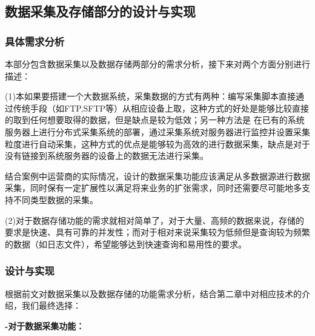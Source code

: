 \documentclass{HustGraduPaper}
\begin{document}
    \subsection{数据采集及存储部分的设计与实现}
    \subsubsection{具体需求分析}
    本部分包含数据采集以及数据存储两部分的需求分析，接下来对两个方面分别进行描述：
    
    (1)本如果要搭建一个大数据系统，采集数据的方式有两种：编写采集脚本直接通过传统手段（如FTP,SFTP等）从相应设备上取，这种方式的好处是能够比较直接的取到任何想要取得的数据，但是缺点是较为低效；另一种方法是
    在已有的系统服务器上进行分布式采集系统的部署，通过采集系统对服务器进行监控并设置采集粒度进行自动采集，这种方式的优点是能够较为高效的进行数据采集，缺点是对于没有链接到系统服务器的设备上的数据无法进行采集。
    
    结合案例中运营商的实际情况，设计的数据采集功能应该满足从多数据源进行数据采集，同时保有一定扩展性以满足将来业务的扩张需求，同时还需要尽可能地多支持不同类型数据的采集。

    (2)对于数据存储功能的需求就相对简单了，对于大量、高频的数据来说，存储的要求是快速、具有可靠的并发性；而对于相对来说采集较为低频但是查询较为频繁的数据（如日志文件），希望能够达到快速查询和易用性的要求。
    \subsubsection{设计与实现}
    根据前文对数据采集以及数据存储的功能需求分析，结合第二章中对相应技术的介绍，我们最终选择：

    {\songti \bfseries-对于数据采集功能：}
    
\end{document}
